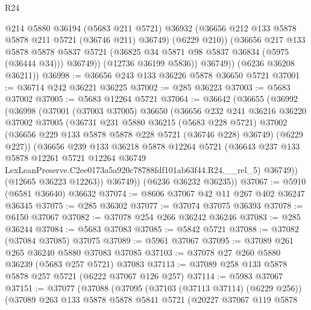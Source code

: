 \begin{lexlean}{R24}
\begin{coremodule}
                @214
                @5880
                @36194
                (@5683 @211 @5721)
                @36932
                (@36656 @212 @133 @5878 @5878 @211 @5721 (@36746 @211) @36749)
                (@6229 @210))
              (@36656
                @217
                @133
                @5878
                @5878
                @5837
                @5721
                (@36825 @34 @5871 @98 @5837 @36834 (@5975 (@36444 @34)))
                @36749))
            (@12736 @36199 @5836))
          @36749))
      (@6236 @36208 @36211))
@36998 := @36656 @243 @133 @36226 @5878 @36650 @5721
@37001 := @36714 @242 @36221 @36225
@37002 := @285 @36223
@37003 := @5683 @37002
@37005 := @5683 @12264 @5721
@37064 := @36642
    (@36655
      (@36992
        (@36998
          (@37001
            (@37003 @37005)
            @36650
            (@36656
              @232
              @241
              @36216
              @36220
              @37002
              @37005
              (@36731
                @231
                @5880
                @36215
                (@5683 @228 @5721)
                @37002
                (@36656 @229 @133 @5878 @5878 @228 @5721 (@36746 @228) @36749)
                (@6229 @227))
              (@36656
                @239
                @133
                @36218
                @5878
                @12264
                @5721
                (@36643
                  @237
                  @133
                  @5878
                  @12261
                  @5721
                  @12264
                  @36749
                  LexLeanPreserve.C2ee0173a5a920c78788fdf101ab63f44.R24.__rel_5)
                @36749))
            (@12665 @36223 @12263))
          @36749))
      (@6236 @36232 @36235))
@37067 := @5910 (@6581 @36640) @36632
@37074 := @8606 @37067 @42 @11 @267 @402 @36247 @36345
@37075 := @285 @36302
@37077 := @37074 @37075 @36393
@37078 := @6150 @37067
@37082 := @37078 @254 @266 @36242 @36246
@37083 := @285 @36244
@37084 := @5683 @37083
@37085 := @5842 @5721
@37088 := @37082 (@37084 @37085) @37075
@37089 := @5961 @37067
@37095 := @37089 @261 @265 @36240 @5880 @37083 @37085
@37103 := @37078 @27 @260 @5880 @36239 (@5683 @257 @5721) @37083
@37113 := @37089 @258 @133 @5878 @5878 @257 @5721 (@6222 @37067 @126 @257)
@37114 := @5983 @37067
@37151 := @37077
    (@37088
      (@37095
        (@37103 (@37113 @37114) (@6229 @256))
        (@37089
          @263
          @133
          @5878
          @5878
          @5841
          @5721
          (@20227
            @37067
            @119
            @5878

\end{coremodule}
\end{lexlean}
